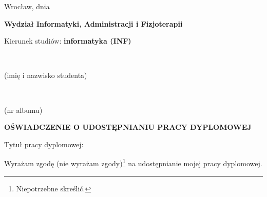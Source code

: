 

\makeatletter
{}

\begin{flushright}
    Wrocław, dnia \@when
  \end{flushright}

  \begin{flushleft}
    {\fontsize{14}{14} \selectfont
    
    \vspace*{20pt}
    {\bf Wydział Informatyki, Administracji i Fizjoterapii}
    
    \bigskip
    Kierunek studiów: {\bf informatyka (INF)}
    }  
  \vspace*{30pt}
  
  {~\@author} %
  \vspace*{-4pt}
  
  \makebox[220pt][r]{\dotfill} %

  \vspace*{-2pt}
  {\scriptsize (imię i nazwisko studenta)}

  \bigskip
  {~\@album} %
  
  \vspace*{-4pt}
  \makebox[220pt][r]{\dotfill} %
  
  \vspace*{-2pt}
  {\scriptsize (nr albumu)}
\end{flushleft}

  \bigskip

\begin{center}
  {\fontsize{16}{16} \selectfont \bf OŚWIADCZENIE O UDOSTĘPNIANIU PRACY DYPLOMOWEJ}
\end{center}

\bigskip

\begin{flushright} %
    \vspace*{-4pt}
    \parbox{350pt}{
        Tytuł pracy dyplomowej: ~\@title
      }
\end{flushright}

\bigskip

\begin{flushright}
  Wyrażam zgodę (nie wyrażam zgody)\footnote{Niepotrzebne skreślić.} na udostępnianie mojej pracy dyplomowej.
\end{flushright}

\bigskip

\vspace*{30pt}
\begin{flushright} %
    \makebox[150pt]{\dotfill} %
  
  \vspace*{-2pt}
\end{flushright}

\restoregeometry
\makeatother